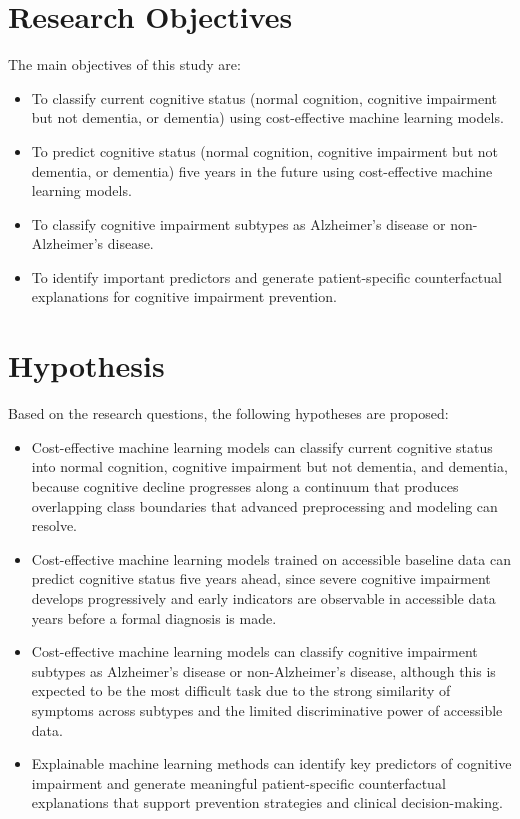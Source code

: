 \section{Research Objectives}
The main objectives of this study are:
\begin{itemize}
    \item To classify current cognitive status (normal cognition, cognitive impairment but not dementia, or dementia) using cost-effective machine learning models.
    \item To predict cognitive status (normal cognition, cognitive impairment but not dementia, or dementia) five years in the future using cost-effective machine learning models.
    \item To classify cognitive impairment subtypes as Alzheimer's disease or non-Alzheimer's disease.
    \item To identify important predictors and generate patient-specific counterfactual explanations for cognitive impairment prevention.
\end{itemize}

\section{Hypothesis}
Based on the research questions, the following hypotheses are proposed:
\begin{itemize}
    \item Cost-effective machine learning models can classify current cognitive status into normal cognition, cognitive impairment but not dementia, and dementia, because cognitive decline progresses along a continuum that produces overlapping class boundaries that advanced preprocessing and modeling can resolve.
    \item Cost-effective machine learning models trained on accessible baseline data can predict cognitive status five years ahead, since severe cognitive impairment develops progressively and early indicators are observable in accessible data years before a formal diagnosis is made.
    \item Cost-effective machine learning models can classify cognitive impairment subtypes as Alzheimer's disease or non-Alzheimer's disease, although this is expected to be the most difficult task due to the strong similarity of symptoms across subtypes and the limited discriminative power of accessible data.
    \item Explainable machine learning methods can identify key predictors of cognitive impairment and generate meaningful patient-specific counterfactual explanations that support prevention strategies and clinical decision-making.
\end{itemize}

